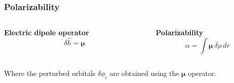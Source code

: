 \begin{frame}
\frametitle{Polarizability}
\begin{columns}

\begin{column}[b]{0.5\textwidth}
\centering
\textbf{Electric dipole operator}
\begin{equation}
    \nonumber
    \delta \hat{h} = \boldsymbol{\mu}
\end{equation}
\end{column}


\begin{column}[b]{0.5\textwidth}
\centering
\textbf{Polarizability}
\begin{equation}
    \nonumber
    \alpha 
    = \int \boldsymbol{\mu} \ \delta\rho \ dr
\end{equation}
\end{column}
\end{columns}

\vspace{5mm}

\centering
Where the perturbed orbitals $\delta\phi_i$ are obtained using 
the $\boldsymbol{\mu}$ operator.

\vspace{5mm}


\end{frame}
